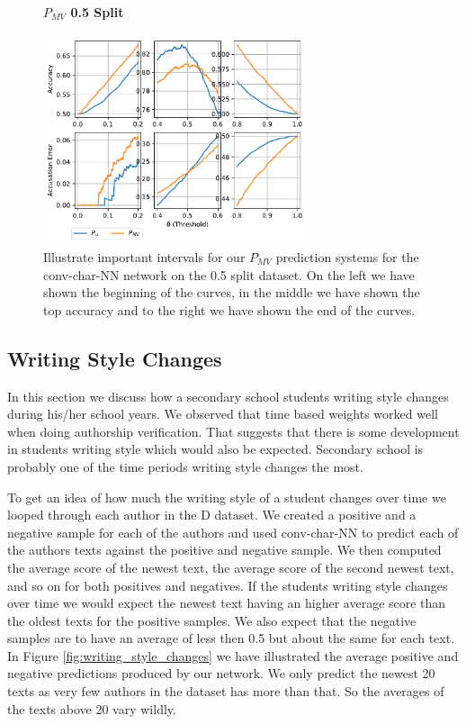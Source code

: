 \begin{description}
        \begin{figure}
            \centering
            \textbf{$P_{MV}$ 0.5 Split}\par\medskip
            \includegraphics[width=0.7\textwidth]{./pictures/discussion/conv_char_nn_prediction_zoom_50_majority_vote}
            \caption{Illustrate important intervals for our $P_{MV}$ prediction
                systems for the \gls{conv-char-NN} network on the 0.5 split
                dataset. On the left we have shown the beginning of the curves,
                in the middle we have shown the top accuracy and to the right we
                have shown the end of the curves.}
            \label{fig:conv_char_prediction_zoom_50_majority_vote}
        \end{figure}

\end{description}


\subsection{Writing Style Changes}

In this section we discuss how a secondary school students writing style changes
during his/her school years. We observed that time based weights worked well
when doing authorship verification. That suggests that there is some development
in students writing style which would also be expected. Secondary school is
probably one of the time periods writing style changes the most.

To get an idea of how much the writing style of a student changes over time we
looped through each author in the \gls{D} dataset. We created a positive and a
negative sample for each of the authors and used \gls{conv-char-NN} to predict
each of the authors texts against the positive and negative sample. We then
computed the average score of the newest text, the average score of the second
newest text, and so on for both positives and negatives. If the students writing
style changes over time we would expect the newest text having an higher average
score than the oldest texts for the positive samples. We also expect that the
negative samples are to have an average of less then 0.5 but about the same
for each text. In Figure \ref{fig:writing_style_changes} we have illustrated
the average positive and negative predictions produced by our network. We only
predict the newest 20 texts as very few authors in the dataset has more than
that. So the averages of the texts above 20 vary wildly.

